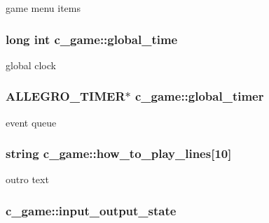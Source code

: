 game menu items \hypertarget{classc__game_afd3e4b96f2e16848b1a81a8349ef9c85}{
\subsubsection[{global\-\_\-time}]{\setlength{\rightskip}{0pt plus 5cm}long int c\-\_\-game\-::global\-\_\-time\hspace{0.3cm}{\ttfamily [protected]}}}\label{classc__game_afd3e4b96f2e16848b1a81a8349ef9c85}
global clock \hypertarget{classc__game_ae2ac3ae12fba38e6626979b941406dbe}{
\subsubsection[{global\-\_\-timer}]{\setlength{\rightskip}{0pt plus 5cm}A\-L\-L\-E\-G\-R\-O\-\_\-\-T\-I\-M\-E\-R$\ast$ c\-\_\-game\-::global\-\_\-timer\hspace{0.3cm}{\ttfamily [protected]}}}\label{classc__game_ae2ac3ae12fba38e6626979b941406dbe}
event queue \hypertarget{classc__game_a16ac36db4e4853c532bd471193a39838}{
\subsubsection[{how\-\_\-to\-\_\-play\-\_\-lines}]{\setlength{\rightskip}{0pt plus 5cm}string c\-\_\-game\-::how\-\_\-to\-\_\-play\-\_\-lines\mbox{[}10\mbox{]}\hspace{0.3cm}{\ttfamily [protected]}}}\label{classc__game_a16ac36db4e4853c532bd471193a39838}
outro text \hypertarget{classc__game_ad2ad5aa7d756f89bb53359d4c74db8da}{
\subsubsection[{input\-\_\-output\-\_\-state}]{ c\-\_\-game\-::input\-\_\-output\-\_\-state\hspace{0.3cm}{\ttfamily [protected]}}}\label{classc__game_ad2ad5aa7d756f89bb53359d4c74db8da}
